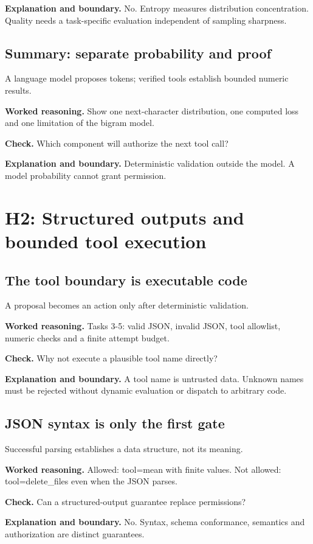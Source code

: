\textbf{Explanation and boundary.} No. Entropy measures distribution concentration. Quality needs a task-specific evaluation independent of sampling sharpness.

\subsection{Summary: separate probability and proof}
A language model proposes tokens; verified tools establish bounded numeric results.

\textbf{Worked reasoning.} Show one next-character distribution, one computed loss and one limitation of the bigram model.

\textbf{Check.} Which component will authorize the next tool call?

\textbf{Explanation and boundary.} Deterministic validation outside the model. A model probability cannot grant permission.

\section{H2: Structured outputs and bounded tool execution}
\subsection{The tool boundary is executable code}
A proposal becomes an action only after deterministic validation.

\textbf{Worked reasoning.} Tasks 3-5: valid JSON, invalid JSON, tool allowlist, numeric checks and a finite attempt budget.

\textbf{Check.} Why not execute a plausible tool name directly?

\textbf{Explanation and boundary.} A tool name is untrusted data. Unknown names must be rejected without dynamic evaluation or dispatch to arbitrary code.

\subsection{JSON syntax is only the first gate}
Successful parsing establishes a data structure, not its meaning.

\textbf{Worked reasoning.} Allowed: tool=mean with finite values. Not allowed: tool=delete\_files even when the JSON parses.

\textbf{Check.} Can a structured-output guarantee replace permissions?

\textbf{Explanation and boundary.} No. Syntax, schema conformance, semantics and authorization are distinct guarantees.

